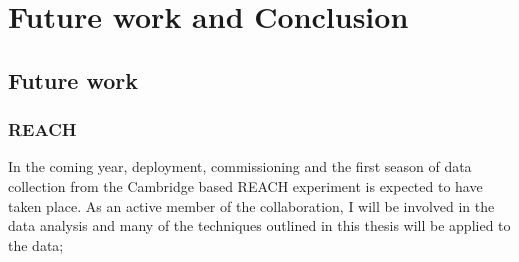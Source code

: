 \chapter{Future work and Conclusion}

\setcounter{section}{0}
\renewcommand\thefigure{\arabic{chapter}.\arabic{figure}}
\renewcommand\thetable{\arabic{chapter}.\arabic{table}}
\renewcommand\thesubsection{\arabic{chapter}.\arabic{section}.\arabic{subsection}}
\renewcommand\thesection{\arabic{chapter}.\arabic{section}}
\setcounter{figure}{0}
\setcounter{table}{0}

\section{Future work}

\subsection{REACH}

In the coming year, deployment, commissioning and the first season of data collection from the Cambridge based REACH experiment is expected to have taken place. As an active member of the collaboration, I will be involved in the data analysis and many of the techniques outlined in this thesis will be applied to the data;

